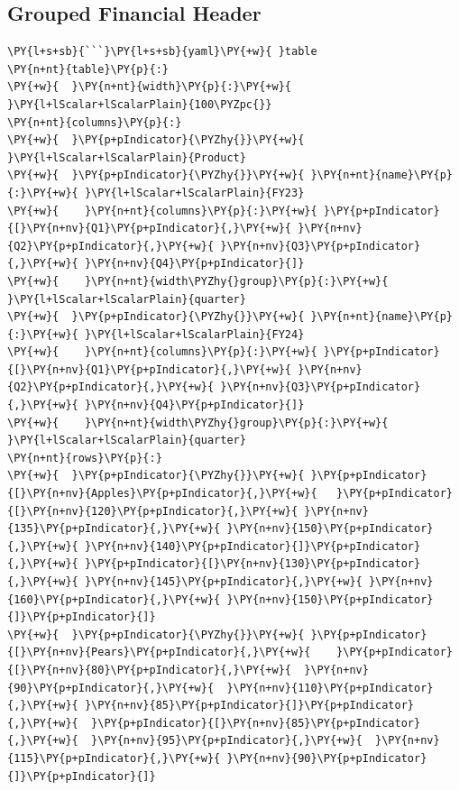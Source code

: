 \documentclass[a4paper,twoside]{article}
\begin{document}
\subsection{Grouped Financial Header}
\begin{tscode}[lang=markdown, engine=pygments]
\begin{Verbatim}[commandchars=\\\{\},breaklines, breakanywhere, commandchars=\\\{\}]
\PY{l+s+sb}{```}\PY{l+s+sb}{yaml}\PY{+w}{ }table
\PY{n+nt}{table}\PY{p}{:}
\PY{+w}{  }\PY{n+nt}{width}\PY{p}{:}\PY{+w}{ }\PY{l+lScalar+lScalarPlain}{100\PYZpc{}}
\PY{n+nt}{columns}\PY{p}{:}
\PY{+w}{  }\PY{p+pIndicator}{\PYZhy{}}\PY{+w}{ }\PY{l+lScalar+lScalarPlain}{Product}
\PY{+w}{  }\PY{p+pIndicator}{\PYZhy{}}\PY{+w}{ }\PY{n+nt}{name}\PY{p}{:}\PY{+w}{ }\PY{l+lScalar+lScalarPlain}{FY23}
\PY{+w}{    }\PY{n+nt}{columns}\PY{p}{:}\PY{+w}{ }\PY{p+pIndicator}{[}\PY{n+nv}{Q1}\PY{p+pIndicator}{,}\PY{+w}{ }\PY{n+nv}{Q2}\PY{p+pIndicator}{,}\PY{+w}{ }\PY{n+nv}{Q3}\PY{p+pIndicator}{,}\PY{+w}{ }\PY{n+nv}{Q4}\PY{p+pIndicator}{]}
\PY{+w}{    }\PY{n+nt}{width\PYZhy{}group}\PY{p}{:}\PY{+w}{ }\PY{l+lScalar+lScalarPlain}{quarter}
\PY{+w}{  }\PY{p+pIndicator}{\PYZhy{}}\PY{+w}{ }\PY{n+nt}{name}\PY{p}{:}\PY{+w}{ }\PY{l+lScalar+lScalarPlain}{FY24}
\PY{+w}{    }\PY{n+nt}{columns}\PY{p}{:}\PY{+w}{ }\PY{p+pIndicator}{[}\PY{n+nv}{Q1}\PY{p+pIndicator}{,}\PY{+w}{ }\PY{n+nv}{Q2}\PY{p+pIndicator}{,}\PY{+w}{ }\PY{n+nv}{Q3}\PY{p+pIndicator}{,}\PY{+w}{ }\PY{n+nv}{Q4}\PY{p+pIndicator}{]}
\PY{+w}{    }\PY{n+nt}{width\PYZhy{}group}\PY{p}{:}\PY{+w}{ }\PY{l+lScalar+lScalarPlain}{quarter}
\PY{n+nt}{rows}\PY{p}{:}
\PY{+w}{  }\PY{p+pIndicator}{\PYZhy{}}\PY{+w}{ }\PY{p+pIndicator}{[}\PY{n+nv}{Apples}\PY{p+pIndicator}{,}\PY{+w}{   }\PY{p+pIndicator}{[}\PY{n+nv}{120}\PY{p+pIndicator}{,}\PY{+w}{ }\PY{n+nv}{135}\PY{p+pIndicator}{,}\PY{+w}{ }\PY{n+nv}{150}\PY{p+pIndicator}{,}\PY{+w}{ }\PY{n+nv}{140}\PY{p+pIndicator}{]}\PY{p+pIndicator}{,}\PY{+w}{ }\PY{p+pIndicator}{[}\PY{n+nv}{130}\PY{p+pIndicator}{,}\PY{+w}{ }\PY{n+nv}{145}\PY{p+pIndicator}{,}\PY{+w}{ }\PY{n+nv}{160}\PY{p+pIndicator}{,}\PY{+w}{ }\PY{n+nv}{150}\PY{p+pIndicator}{]}\PY{p+pIndicator}{]}
\PY{+w}{  }\PY{p+pIndicator}{\PYZhy{}}\PY{+w}{ }\PY{p+pIndicator}{[}\PY{n+nv}{Pears}\PY{p+pIndicator}{,}\PY{+w}{    }\PY{p+pIndicator}{[}\PY{n+nv}{80}\PY{p+pIndicator}{,}\PY{+w}{  }\PY{n+nv}{90}\PY{p+pIndicator}{,}\PY{+w}{  }\PY{n+nv}{110}\PY{p+pIndicator}{,}\PY{+w}{ }\PY{n+nv}{85}\PY{p+pIndicator}{]}\PY{p+pIndicator}{,}\PY{+w}{  }\PY{p+pIndicator}{[}\PY{n+nv}{85}\PY{p+pIndicator}{,}\PY{+w}{  }\PY{n+nv}{95}\PY{p+pIndicator}{,}\PY{+w}{  }\PY{n+nv}{115}\PY{p+pIndicator}{,}\PY{+w}{ }\PY{n+nv}{90}\PY{p+pIndicator}{]}\PY{p+pIndicator}{]}

\end{Verbatim}
\end{tscode}
\end{document}
